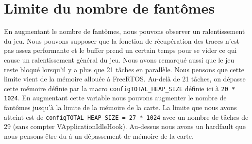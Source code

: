\documentclass[a4paper]{article}
\begin{document}
\section{Limite du nombre de fantômes}
En augmentant le nombre de fantômes, nous pouvons observer un ralentissement du jeu.
Nous pouvons supposer que la fonction de récupération des traces n'est pas assez
performante et le buffer prend un certain temps pour se vider ce qui cause un ralentissement
général du jeu.
\newline
Nous avons remarqué aussi que le jeu reste bloqué lorsqu'il y a plus que 21 tâches
en parallèle. Nous pensons que cette limite vient de la mémoire allouée à FreeRTOS.
Au-delà de 21 tâches, on dépasse cette mémoire définie par la macro \texttt{configTOTAL_HEAP_SIZE}
définie ici à \texttt{20 * 1024}. En augmentant cette variable nous pouvons augmenter le
nombre de fantômes jusqu'à la limite de la mémoire de la carte. La limite que nous
avons atteint est de \texttt{configTOTAL_HEAP_SIZE = 27 * 1024} avec un nombre de tâches
de 29 (sans compter VApplicationIdleHook). Au-dessus nous avons un hardfault que
nous pensons être du à un dépassement de mémoire de la carte.
\end{document}
